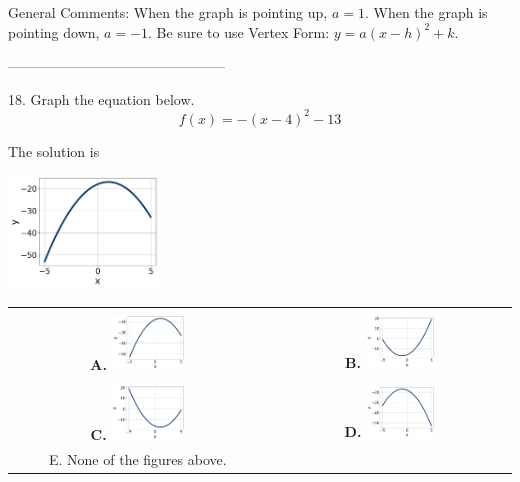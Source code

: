 \documentclass{article}[14pt]
\begin{document}
General Comments: When the graph is pointing up, $a=1$. When the graph is pointing down, $a=-1$. Be sure to use Vertex Form: $y = a(x-h)^2+k$.

-----------------------------------------------

18. Graph the equation below.
$$ f(x) = -(x-4)^2 - 13 $$ 

 
 The solution is  
 \begin{center} \includegraphics[width=0.3\textwidth]{../Figures/quadraticEquationToGraphAA.png} \end{center}\begin{tabular}{|c|c|} 
\hline 
 & \tabularnewline 
 \textbf{A.} \includegraphics[width=0.3\textwidth]{../Figures/quadraticEquationToGraphAA.png} & \textbf{B.} \includegraphics[width=0.3\textwidth]{../Figures/quadraticEquationToGraphBA.png} \tabularnewline 
\hline 
 & \tabularnewline 
 \textbf{C.} \includegraphics[width=0.3\textwidth]{../Figures/quadraticEquationToGraphCA.png} & \textbf{D.} \includegraphics[width=0.3\textwidth]{../Figures/quadraticEquationToGraphDA.png} \tabularnewline 
\hline 
 E. None of the figures above. & \tabularnewline 
\hline 
 \end{tabular} 
 
\end{document}
